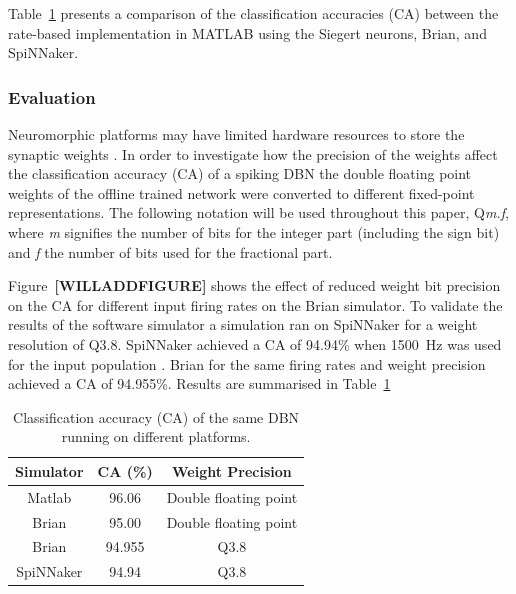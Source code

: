  
Table~\ref{tab:casimulators} presents a comparison of the classification accuracies (CA) between the rate-based implementation in MATLAB using the Siegert neurons, Brian, and SpiNNaker. %





\subsubsection{Evaluation}


Neuromorphic platforms may have limited hardware resources to store the synaptic weights \citep{Schemmel_etal10,Merolla08082014}. In order to investigate how the precision of the weights affect the classification accuracy (CA) of a spiking DBN the double floating point weights of the offline trained network were converted to different fixed-point representations. The following notation will be used throughout this paper, Q\textit{m.f}, where \textit{m} signifies the number of bits for the integer part (including the sign bit) and \textit{f} the number of bits used for the fractional part.

Figure~\textbf{[WILLADDFIGURE]} shows the effect of reduced weight bit precision on the CA for different input firing rates on the Brian simulator. To validate the results of the software simulator a simulation ran on SpiNNaker for a weight resolution of Q3.8. SpiNNaker achieved a CA of 94.94\% when 1500~Hz was used for the input population \citep{SpinnakerDBN2015,iscasSpinnakerAcceptedDemo}. Brian for the same firing rates and weight precision achieved a CA of 94.955\%. Results are summarised in Table~\ref{tab:casimulators}   


\begin{table}[h]
\caption{Classification accuracy (CA) of the same DBN running on different platforms.}
\begin{center}
\begin{tabular} {c|c|c}
	Simulator & CA (\%) & Weight Precision \\
    \hline
    Matlab & 96.06 & Double floating point\\
    Brian & 95.00 & Double floating point\\
    Brian & 94.955 & Q3.8\\
    SpiNNaker & 94.94 & Q3.8\\
\end{tabular}
\label{tab:casimulators}
\end{center}
\end{table}

